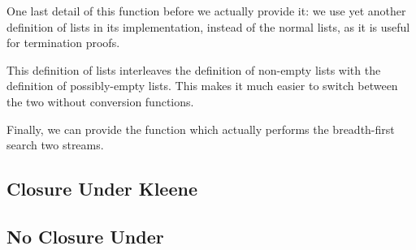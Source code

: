 One last detail of this function before we actually provide it: we use yet
another definition of lists in its implementation, instead of the normal lists,
as it is useful for termination proofs.
\begin{agdalisting*}
  \begin{multicols}{2} \centering
     \columnbreak
  \end{multicols}
\end{agdalisting*}
This definition of lists interleaves the definition of non-empty lists with the
definition of possibly-empty lists.
This makes it much easier to switch between the two without conversion
functions.

Finally, we can provide the function which actually performs the breadth-first
search two streams.
\begin{agdalisting*}
\end{agdalisting*}
\subsection{Closure Under Kleene}
\subsection{No Closure Under \AgdaDatatype{\(\Pi\)}}



